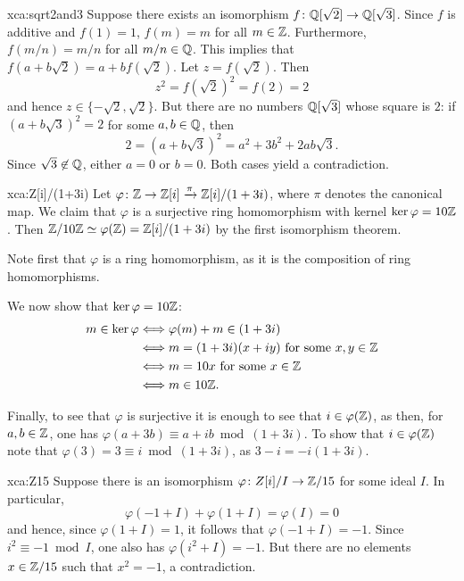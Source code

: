 \begin{sol}{xca:sqrt2and3}
Suppose there exists an isomorphism $f\colon \mathbb{Q}[\sqrt{2}]\to\mathbb{Q}[\sqrt{3}]$. 
Since $f$ is additive and $f(1)=1$, $f(m)=m$ for all $m\in\mathbb{Z}$. Furthermore,
$f(m/n)=m/n$ for all $m/n\in\mathbb{Q}$. This implies that $f(a+b\sqrt{2})=a+bf(\sqrt{2})$. 
Let $z=f(\sqrt{2})$. Then 
\[
z^2=f(\sqrt{2})^2=f(2)=2
\]
and hence $z\in\{-\sqrt{2},\sqrt{2}\}$. But there are no numbers 
$\mathbb{Q}[\sqrt{3}]$ whose square is $2$: if $\left(a+b\sqrt{3}\right)^2=2$ for some
$a,b\in\mathbb{Q}$, then 
\[
2=\left(a+b\sqrt{3}\right)^2=a^2+3b^2+2ab\sqrt{3}.
\]
Since $\sqrt{3}\not\in\mathbb{Q}$, either $a=0$ or $b=0$. Both cases yield 
a contradiction. 
\end{sol}

\begin{sol}{xca:Z[i]/(1+3i)}
    Let $\varphi\colon\mathbb{Z}\to\mathbb{Z}[i]\xrightarrow{\pi}\mathbb{Z}[i]/(1+3i)$, where $\pi$ denotes the canonical map. 
    We claim that $\varphi$ is a surjective ring homomorphism with kernel $\ker\varphi=10\mathbb{Z}$. Then
    $\mathbb{Z}/10\mathbb{Z}\simeq\varphi(\mathbb{Z})=\mathbb{Z}[i]/(1+3i)$ by the first isomorphism theorem. 

    Note first that $\varphi$ is a ring homomorphism, as it is 
    the composition of ring homomorphisms. 
    
    We now show that $\ker\varphi=10\mathbb{Z}$: 
    \begin{align*} 
    m\in\ker\varphi&\Longleftrightarrow \varphi(m)+m\in (1+3i)\\
    &\Longleftrightarrow m=(1+3i)(x+iy)\text{ 
    for some $x,y\in\mathbb{Z}$}\\
    &\Longleftrightarrow m=10x\text{ for some $x\in\mathbb{Z}$}\\
    &\Longleftrightarrow m\in 10\mathbb{Z}.
    \end{align*}

    Finally, to see that $\varphi$ is surjective it is enough to 
    see that $i\in\varphi(\mathbb{Z})$, as 
    then, for $a,b\in\mathbb{Z}$, one has 
    $\varphi(a+3b)\equiv a+ib\bmod (1+3i)$. 
    To show that $i\in\varphi(\mathbb{Z})$
    note
    that $\varphi(3)=3\equiv i\bmod (1+3i)$, as $3-i=-i(1+3i)$. 
\end{sol}



\begin{sol}{xca:Z15}
    Suppose there is an isomorphism $\varphi\colon Z[i]/I\to \mathbb{Z}/15$ for some 
    ideal $I$. In particular, 
    \[ 
    \varphi(-1+I)+\varphi(1+I)=\varphi(I)=0
    \]
    and hence, since $\varphi(1+I)=1$, it follows that $\varphi(-1+I)=-1$. Since 
    $i^2\equiv -1\bmod I$, one also has $\varphi(i^2+I)=-1$. But there are no
    elements $x\in\mathbb{Z}/15$ such that $x^2=-1$, a contradiction. 
\end{sol}

